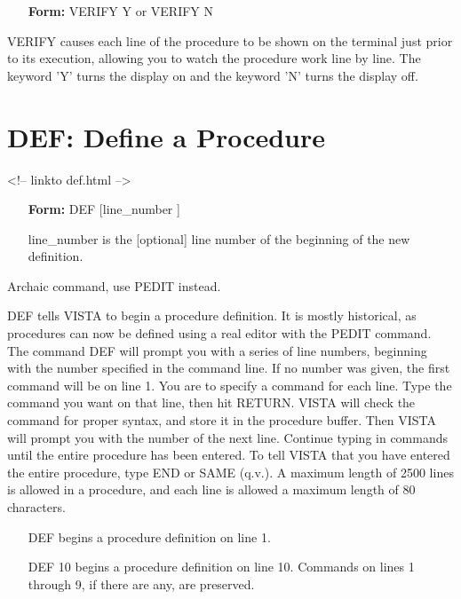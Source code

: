 \begin{itemize}
  \item[\textbf{Form: } VERIFY Y or VERIFY N\hfill]{}
\end{itemize}
VERIFY causes each line of the procedure to be shown on the terminal just
prior to its execution, allowing you to watch the procedure work line by
line.  The keyword 'Y' turns the display on and the keyword 'N' turns the
display off.

\section{DEF: Define a Procedure}
\begin{rawhtml}
<!-- linkto def.html -->
\end{rawhtml}
\begin{itemize} 
  \item[\textbf{Form: } DEF [line\_number]\hfill]{}
  \item[line\_number]{is the [optional] line number of the
beginning of the new definition.}
\end{itemize}

Archaic command, use PEDIT instead.

DEF tells VISTA to begin a procedure definition. It is mostly historical,
as procedures can now be defined using a real editor with the PEDIT
command. The command DEF will prompt you with a series of line numbers,
beginning with the number specified in the command line.  If no number was
given, the first command will be on line 1.  You are to specify a command
for each line.  Type the command you want on that line, then hit RETURN.
VISTA will check the command for proper syntax, and store it in the
procedure buffer. Then VISTA will prompt you with the number of the next
line.  Continue typing in commands until the entire procedure has been
entered.  To tell VISTA that you have entered the entire procedure, type
END or SAME (q.v.).  A maximum length of 2500 lines is allowed in a
procedure, and each line is allowed a maximum length of 80 characters.

\begin{itemize}
  \item[DEF\hfill]{begins a procedure definition on line 1.}
  \item[DEF 10\hfill]{begins a procedure definition on line 10.  
       Commands on lines 1 through 9, if there are any, are preserved.}
\end{itemize}

